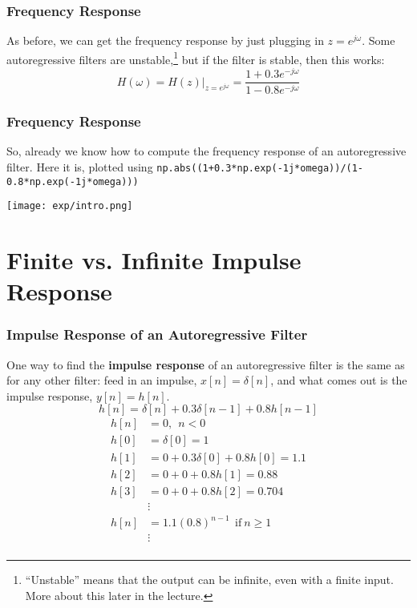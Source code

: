 \documentclass{beamer}
\begin{document}
\begin{frame}
  \frametitle{Frequency Response}

  As before, we can get the frequency response by just plugging in
  $z=e^{j\omega}$.  Some autoregressive filters are
  unstable,\footnote{``Unstable'' means that the output can be
    infinite, even with a finite input.  More about this later in the
    lecture.} but if the filter is stable, then this works:
  \[
  H(\omega) = H(z)\vert_{z=e^{j\omega}} = \frac{1+0.3e^{-j\omega}}{1-0.8 e^{-j\omega}}
  \]
\end{frame}

\begin{frame}
  \frametitle{Frequency Response}

  So, already we know how to compute the frequency response of an autoregressive filter.
  Here it is, plotted using {\tt np.abs((1+0.3*np.exp(-1j*omega))/(1-0.8*np.exp(-1j*omega)))}
  
  \centerline{\texttt{[image: exp/intro.png]}}
\end{frame}

\section[FIR and IIR]{Finite vs. Infinite Impulse Response}
\setcounter{subsection}{1}

\begin{frame}
  \frametitle{Impulse Response of an Autoregressive Filter}

  One way to find the {\bf impulse response} of an autoregressive
  filter is the same as for any other filter: feed in an impulse,
  $x[n]=\delta[n]$, and what comes out is the impulse response,
  $y[n]=h[n]$.
  \[
  h[n] = \delta[n] + 0.3\delta[n-1] + 0.8 h[n-1]
  \]
  \begin{align*}
    h[n] &= 0,~~n<0\\
    h[0] &= \delta[0] = 1\\
    h[1] &= 0 + 0.3\delta[0] + 0.8 h[0] = 1.1\\
    h[2] &= 0 + 0 + 0.8 h[1] = 0.88\\
    h[3] &= 0+ 0 + 0.8 h[2] = 0.704\\
    & \vdots\\
    h[n] &= 1.1(0.8)^{n-1}~~\mbox{if}~n\ge 1\\
    & \vdots\\
  \end{align*}
\end{frame}
\end{document}
